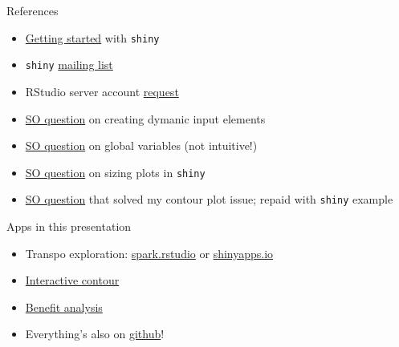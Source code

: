 \documentclass[sans,aspectratio=169,presentation,bigger,fleqn]{beamer}
\begin{document}
\begin{frame}[fragile,label=sec-24]{References}
 \begin{itemize}
\item \href{http://www.rstudio.com/shiny/}{Getting started} with \texttt{shiny}
\item \texttt{shiny} \href{https://groups.google.com/forum/#!forum/shiny-discuss}{mailing list}
\item RStudio server account \href{https://shinyapps.io/}{request}
\item \href{http://stackoverflow.com/questions/19130455/create-dynamic-number-of-input-elements-with-r-shiny}{SO question} on creating dymanic input elements
\item \href{http://stackoverflow.com/questions/17683933/set-global-object-in-shiny}{SO question} on global variables (not intuitive!)
\item \href{http://stackoverflow.com/questions/17838709/scale-and-size-of-plot-in-rstudio-shiny}{SO question} on sizing plots in \texttt{shiny}
\item \href{http://stackoverflow.com/questions/17958730/faceting-a-set-of-contour-plots-in-ggplot-r}{SO question} that solved my contour plot issue; repaid with \texttt{shiny} example
\end{itemize}
\end{frame}
\begin{frame}[label=sec-25]{Apps in this presentation}
\begin{itemize}
\item Transpo exploration: \href{http://spark.rstudio.com/jwhendy/transpo-exploration/}{spark.rstudio} or \href{http://jwhendy.shinyapps.io/transpo-exploration}{shinyapps.io}
\item \href{http://spark.rstudio.com/jwhendy/interactive-contour/}{Interactive contour}
\item \href{http://spark.rstudio.com/jwhendy/insurance-visualizer/}{Benefit analysis}
\item Everything's also on \href{https://github.com/jwhendy/devFest-shiny}{github}!
\end{itemize}
\end{frame}
\end{document}
